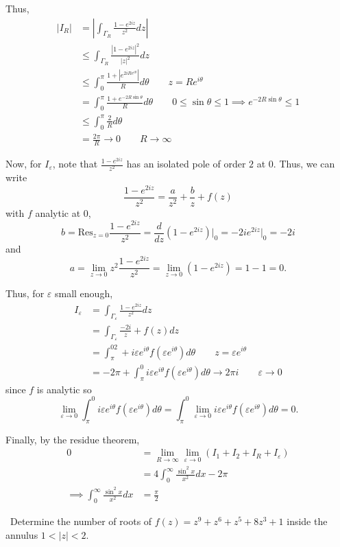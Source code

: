 \documentclass[12pt]{Homework}
\newcommand{\res}{\text{Res}}
\begin{document}
\begin{solution}
Thus, \begin{align*}
    |I_R|&=\left|\int_{\Gamma_R}\frac{1-e^{2iz}}{z^2}dz\right|\\
    &\le\int_{\Gamma_R}\frac{|1-e^{2iz}|^2}{|z|^2}dz\\
    &\le\int_0^\pi\frac{1+|e^{2iRe^{i\theta}}|}{R}d\theta\qquad z=Re^{i\theta}\\
    &=\int_0^\pi\frac{1+e^{-2R\sin\theta}}{R}d\theta\qquad 0\le\sin\theta\le1\implies e^{-2R\sin\theta}\le 1\\
    &\le\int_0^\pi\frac{2}{R}d\theta\\
    &=\frac{2\pi}{R}\to0\qquad R\to\infty
\end{align*}

Now, for $I_\varepsilon$, note that $\frac{1-e^{2iz}}{z^2}$ has an isolated pole of order $2$ at $0$. Thus, we can write $$\frac{1-e^{2iz}}{z^2}=\frac{a}{z^2}+\frac{b}{z}+f(z)$$ with $f$ analytic at $0$, $$b=\res_{z=0}\frac{1-e^{2iz}}{z^2}=\frac{d}{dz}(1-e^{2iz})\Big|_0=-2ie^{2iz}\Big|_0=-2i$$ and $$a=\lim_{z\to0}z^2\frac{1-e^{2iz}}{z^2}=\lim_{z\to0}(1-e^{2iz})=1-1=0.$$ 

Thus, for $\varepsilon$ small enough, \begin{align*}
    I_\varepsilon&=\int_{\Gamma_\varepsilon}\frac{1-e^{2iz}}{z^2}dz\\
    &=\int_{\Gamma_\varepsilon}\frac{-2 i}{z}+f(z)dz\\
    &=\int_\pi^02+i\varepsilon e^{i\theta}f(\varepsilon e^{i\theta})d\theta\qquad z=\varepsilon e^{i\theta}\\
    &=-2\pi +\int_\pi^0i\varepsilon e^{i\theta}f(\varepsilon e^{i\theta})d\theta\to 2\pi i\qquad \varepsilon\to0
\end{align*} since $f$ is analytic so $$\lim_{\varepsilon\to0}\int_\pi^0i\varepsilon e^{i\theta}f(\varepsilon e^{i\theta})d\theta=\int_\pi^0\lim_{\varepsilon\to0}i\varepsilon e^{i\theta}f(\varepsilon e^{i\theta})d\theta=0.$$

Finally, by the residue theorem, \begin{align*}
    0&=\lim_{R\to\infty}\lim_{\varepsilon\to0}(I_1+I_2+I_R+I_\varepsilon)\\
    &=4\int_0^\infty\frac{\sin^2x}{x^2}dx-2\pi\\
    \implies \int_0^\infty\frac{\sin^2x}{x^2}dx&=\frac{\pi}{2}
\end{align*}
\end{solution}
\newpage



\begin{problem} $\,$
Determine the number of roots of $f(z)=z^9+z^6+z^5+8z^3+1$ inside the annulus $1<|z|<2$. 
\end{problem}
\end{document}
